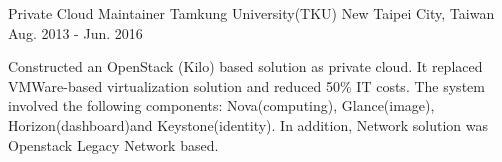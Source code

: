 \begin{cventries}
    \cventry
        {Private Cloud Maintainer}
        {Tamkung University(TKU)}
        {New Taipei City, Taiwan}
        {Aug. 2013 - Jun. 2016}
        {
            \begin{cvitems}
                \item
                    {
                        Constructed an OpenStack (Kilo) based solution as private cloud. It replaced VMWare-based virtualization solution and reduced 50\% IT costs. The system involved the following components: Nova(computing), Glance(image), Horizon(dashboard)and Keystone(identity). In addition, Network solution was Openstack Legacy Network based. 
                    }
            \end{cvitems}
        }

\end{cventries}
